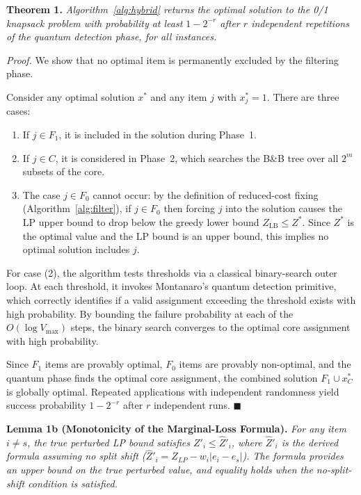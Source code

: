 \documentclass[conference]{IEEEtran}
\begin{document}
\textbf{Theorem 1.} \textit{Algorithm~\ref{alg:hybrid} returns the optimal solution to the 0/1 knapsack problem with probability at least $1 - 2^{-r}$ after $r$ independent repetitions of the quantum detection phase, for all instances.}

\textit{Proof.} We show that no optimal item is permanently excluded by the filtering phase.

Consider any optimal solution $x^*$ and any item $j$ with $x_j^* = 1$. There are three cases:
\begin{enumerate}
    \item If $j \in F_1$, it is included in the solution during Phase~1.
    \item If $j \in C$, it is considered in Phase~2, which searches the B\&B tree over all $2^m$ subsets of the core.
    \item The case $j \in F_0$ cannot occur: by the definition of reduced-cost fixing (Algorithm~\ref{alg:filter}), if $j \in F_0$ then forcing $j$ into the solution causes the LP upper bound to drop below the greedy lower bound $Z_{\text{LB}} \leq Z^*$. Since $Z^*$ is the optimal value and the LP bound is an upper bound, this implies no optimal solution includes $j$.
\end{enumerate}

For case (2), the algorithm tests thresholds via a classical binary-search outer loop. At each threshold, it invokes Montanaro's quantum detection primitive, which correctly identifies if a valid assignment exceeding the threshold exists with high probability. By bounding the failure probability at each of the $O(\log V_{\max})$ steps, the binary search converges to the optimal core assignment with high probability.

Since $F_1$ items are provably optimal, $F_0$ items are provably non-optimal, and the quantum phase finds the optimal core assignment, the combined solution $F_1 \cup x^*_C$ is globally optimal. Repeated applications with independent randomness yield success probability $1 - 2^{-r}$ after $r$ independent runs. \hfill$\blacksquare$

\textbf{Lemma 1b (Monotonicity of the Marginal-Loss Formula).} \label{lem:monotonicity} \textit{For any item $i \ne s$, the true perturbed LP bound satisfies $Z'_i \le \hat{Z}'_i$, where $\hat{Z}'_i$ is the derived formula assuming no split shift ($\hat{Z}'_i = Z_{LP} - w_i |e_i - e_s|$). The formula provides an upper bound on the true perturbed value, and equality holds when the no-split-shift condition is satisfied.}
\end{document}
